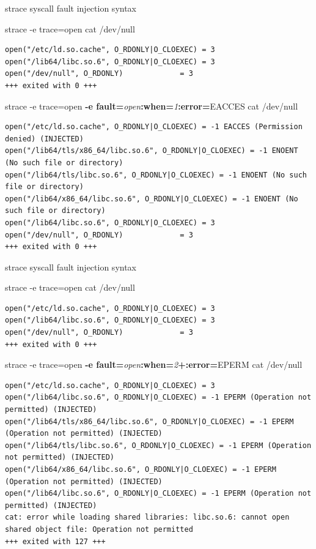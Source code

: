 \documentclass[unicode,aspectratio=169]{beamer}
\begin{document}
\begin{frame}[fragile]{strace syscall fault injection syntax}
\scriptsize
\begin{block}{\large strace -e trace=open cat /dev/null}
\begin{verbatim}
open("/etc/ld.so.cache", O_RDONLY|O_CLOEXEC) = 3
open("/lib64/libc.so.6", O_RDONLY|O_CLOEXEC) = 3
open("/dev/null", O_RDONLY)             = 3
+++ exited with 0 +++
\end{verbatim}
\end{block}
\begin{block}{\large strace -e trace=open {\bf -e fault=}{\it open}{\bf :when=}{\it 1}{\bf :error=}{\sc EACCES} cat /dev/null}
\begin{verbatim}
open("/etc/ld.so.cache", O_RDONLY|O_CLOEXEC) = -1 EACCES (Permission denied) (INJECTED)
open("/lib64/tls/x86_64/libc.so.6", O_RDONLY|O_CLOEXEC) = -1 ENOENT (No such file or directory)
open("/lib64/tls/libc.so.6", O_RDONLY|O_CLOEXEC) = -1 ENOENT (No such file or directory)
open("/lib64/x86_64/libc.so.6", O_RDONLY|O_CLOEXEC) = -1 ENOENT (No such file or directory)
open("/lib64/libc.so.6", O_RDONLY|O_CLOEXEC) = 3
open("/dev/null", O_RDONLY)             = 3
+++ exited with 0 +++
\end{verbatim}
\end{block}
\end{frame}

\begin{frame}[fragile]{strace syscall fault injection syntax}
\scriptsize
\begin{block}{\large strace -e trace=open cat /dev/null}
\begin{verbatim}
open("/etc/ld.so.cache", O_RDONLY|O_CLOEXEC) = 3
open("/lib64/libc.so.6", O_RDONLY|O_CLOEXEC) = 3
open("/dev/null", O_RDONLY)             = 3
+++ exited with 0 +++
\end{verbatim}
\end{block}
\begin{block}{\large strace -e trace=open {\bf -e fault=}{\it open}{\bf :when=}{\it 2}{\bf +:error=}{\sc EPERM} cat /dev/null}
\begin{verbatim}
open("/etc/ld.so.cache", O_RDONLY|O_CLOEXEC) = 3
open("/lib64/libc.so.6", O_RDONLY|O_CLOEXEC) = -1 EPERM (Operation not permitted) (INJECTED)
open("/lib64/tls/x86_64/libc.so.6", O_RDONLY|O_CLOEXEC) = -1 EPERM (Operation not permitted) (INJECTED)
open("/lib64/tls/libc.so.6", O_RDONLY|O_CLOEXEC) = -1 EPERM (Operation not permitted) (INJECTED)
open("/lib64/x86_64/libc.so.6", O_RDONLY|O_CLOEXEC) = -1 EPERM (Operation not permitted) (INJECTED)
open("/lib64/libc.so.6", O_RDONLY|O_CLOEXEC) = -1 EPERM (Operation not permitted) (INJECTED)
cat: error while loading shared libraries: libc.so.6: cannot open shared object file: Operation not permitted
+++ exited with 127 +++
\end{verbatim}
\end{block}
\end{frame}
\end{document}
